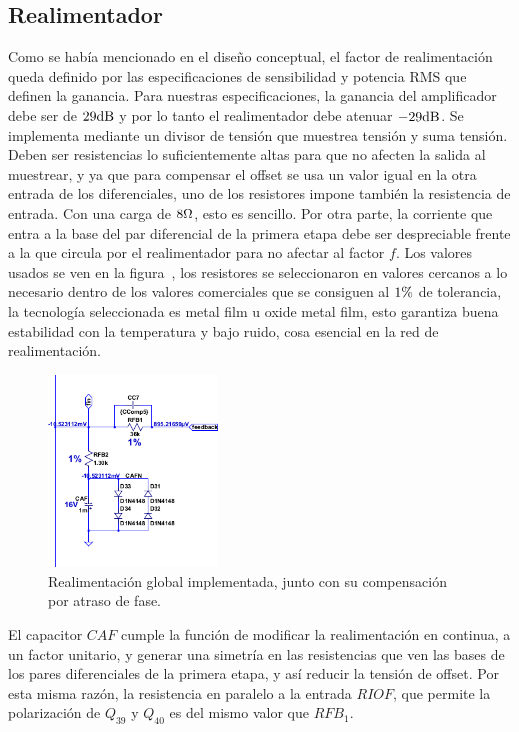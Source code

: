 \subsection{Realimentador}

Como se había mencionado en el diseño conceptual, el factor de realimentación queda definido por las especificaciones de sensibilidad y potencia RMS que definen la ganancia. Para nuestras especificaciones, la ganancia del amplificador debe ser de $29 \si[per-mode=symbol]{\decibel}$ y por lo tanto el realimentador debe atenuar $-29 \si[per-mode=symbol]{\decibel}$. Se implementa mediante un divisor de tensión que muestrea tensión y suma tensión. Deben ser resistencias lo suficientemente altas para que no afecten la salida al muestrear, y ya que para compensar el offset se usa un valor igual en la otra entrada de los diferenciales, uno de los resistores impone también la resistencia de entrada. Con una carga de $8 \si[per-mode=symbol]{\ohm}$, esto es sencillo. Por otra parte, la corriente que entra a la base del par diferencial de la primera etapa debe ser despreciable frente a la que circula por el realimentador para no afectar al factor $f$. Los valores usados se ven en la figura~, los resistores se seleccionaron en valores cercanos a lo necesario dentro de los valores comerciales que se consiguen al $1 \si[per-mode=symbol]{\percent}$ de tolerancia, la tecnología seleccionada es metal film u oxide metal film, esto garantiza buena estabilidad con la temperatura y bajo ruido, cosa esencial en la red de realimentación.

\begin{figure}[H]
	\centering
	\includegraphics[width=0.4\textwidth]{img/realimentacion-global.png}
	\caption{Realimentación global implementada, junto con su compensación por atraso de fase.}
	\label{fig:realimentacion-global}
\end{figure}
 
 El capacitor $CAF$ cumple la función de modificar la realimentación en continua, a un factor unitario, y generar una simetría en las resistencias que ven las bases de los pares diferenciales de la primera etapa, y así reducir la tensión de offset. Por esta misma razón, la resistencia en paralelo a la entrada $RIOF$, que permite la polarización de $Q_{39}$ y $Q_{40}$ es del mismo valor que $RFB_{1}$.
 

